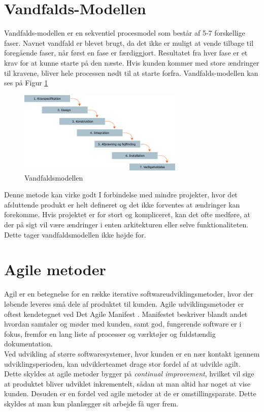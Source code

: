 \section{Vandfalds-Modellen}\label{sec:vandfald}
Vandfalds-modellen er en sekventiel procesmodel som består af 5-7 forskellige faser. 
Navnet vandfald er blevet brugt, da det ikke er muligt at vende tilbage til foregående faser, 
når først en fase er færdiggjort. Resultatet fra hver fase er et krav for at kunne starte på den næste. 
Hvis kunden kommer med store ændringer til kravene, bliver hele processen nødt til at starte forfra.  
Vandfalds-modellen kan ses på Figur \ref{fig:waterfallmodel} \\

\begin{figure}[h]
    \centering
    \includegraphics[width=0.7\textwidth]{figures/waterfall.png}
    \caption{Vandfaldsmodellen \cite{WaterfallModel}}
    \label{fig:waterfallmodel}
\end{figure}

Denne metode kan virke godt I forbindelse med mindre projekter, hvor det afsluttende produkt er 
helt defineret og det ikke forventes at ændringer kan forekomme. Hvis projektet er for stort og kompliceret,
kan det ofte medføre, at der på sigt vil være ændringer i enten arkitekturen eller selve funktionaliteten.
Dette tager vandfaldsmodellen ikke højde for.

\section{Agile metoder}\label{sec:agilemetoder}
Agil er en betegnelse for en række iterative softwareudviklingsmetoder, hvor der løbende leveres små dele af 
produktet til kunden. Agile udviklingsmetoder er oftest kendetegnet ved Det Agile Manifest \cite{AgileManifesto}.
Manifestet beskriver blandt andet hvordan samtaler og møder med kunden, samt god, fungerende software er i fokus, 
fremfor en lang liste af processer og værktøjer og fuldstændig dokumentation. \\

Ved udvikling af større softwaresystemer, hvor kunden er en nær kontakt igennem udviklingsperioden, kan udviklerteamet
drage stor fordel af at udvikle agilt. Dette skyldes at agile metoder bygger på \textit{continual improvement},
hvilket vil sige at produktet bliver udviklet inkrementelt, sådan at man altid har noget at vise kunden. Desuden er en fordel ved agile
metoder at de er omstillingsparate. Dette skyldes at man kun planlægger sit arbejde få uger frem.